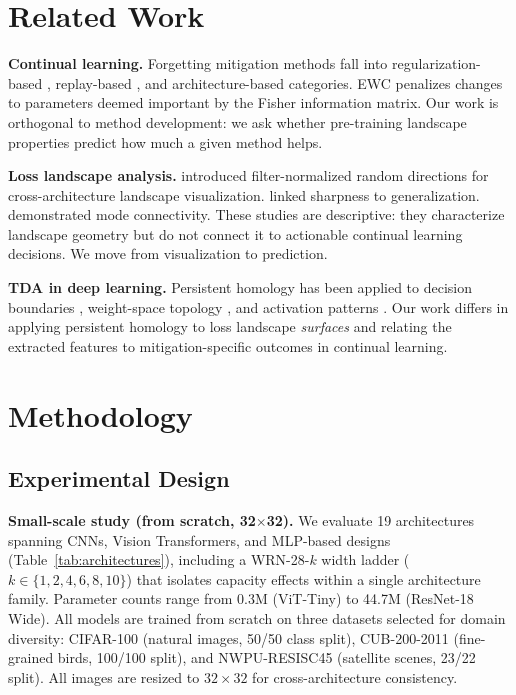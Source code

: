 \documentclass{article}
\begin{document}
\section{Related Work}
\label{sec:related}

\textbf{Continual learning.} Forgetting mitigation methods fall into regularization-based \citep{kirkpatrick2017overcoming, zenke2017continual}, replay-based \citep{rebuffi2017icarl, shin2017continual}, and architecture-based \citep{rusu2016progressive, mallya2018packnet} categories. EWC \citep{kirkpatrick2017overcoming} penalizes changes to parameters deemed important by the Fisher information matrix. Our work is orthogonal to method development: we ask whether pre-training landscape properties predict how much a given method helps.

\textbf{Loss landscape analysis.} \citet{li2018visualizing} introduced filter-normalized random directions for cross-architecture landscape visualization. \citet{keskar2017on} linked sharpness to generalization. \citet{garipov2018loss} demonstrated mode connectivity. These studies are descriptive: they characterize landscape geometry but do not connect it to actionable continual learning decisions. We move from visualization to prediction.

\textbf{TDA in deep learning.} Persistent homology has been applied to decision boundaries \citep{ramamurthy2019topological}, weight-space topology \citep{rieck2019neural}, and activation patterns \citep{naitzat2020topology}. Our work differs in applying persistent homology to loss landscape \emph{surfaces} and relating the extracted features to mitigation-specific outcomes in continual learning.

\section{Methodology}
\label{sec:method}

\subsection{Experimental Design}

\textbf{Small-scale study (from scratch, 32$\times$32).} We evaluate 19 architectures spanning CNNs, Vision Transformers, and MLP-based designs (Table~\ref{tab:architectures}), including a WRN-28-$k$ width ladder ($k \in \{1,2,4,6,8,10\}$) that isolates capacity effects within a single architecture family. Parameter counts range from 0.3M (ViT-Tiny) to 44.7M (ResNet-18 Wide). All models are trained from scratch on three datasets selected for domain diversity: CIFAR-100 (natural images, 50/50 class split), CUB-200-2011 \citep{wah2011caltech} (fine-grained birds, 100/100 split), and NWPU-RESISC45 \citep{cheng2017remote} (satellite scenes, 23/22 split). All images are resized to $32 \times 32$ for cross-architecture consistency.
\end{document}
